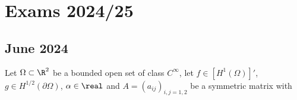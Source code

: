 \section{Exams 2024/25}
\subsection{June 2024}
\begin{exercise}
    Let \(\Omega \subset \R^2\) be a bounded open set of class \(C^\infty\), let \(f \in \left[H^1(\Omega)\right]'\), \(g \in H^{1/2}(\partial \Omega)\), \(\alpha \in \real\) and \(A = (a_{ij})_{i, j=1,2}\) be a symmetric matrix with 

    \end{exercise}